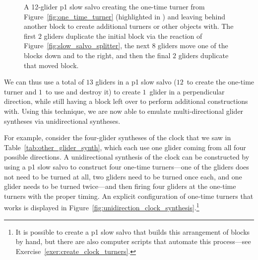 \begin{figure}[!htb]
{}  
	\caption{A 12-glider p1 slow salvo creating the one-time turner from Figure~\ref{fig:one_time_turner} (highlighted in ) and leaving behind another block to create additional turners or other objects with. The first $2$ gliders duplicate the initial block via the reaction of Figure~\ref{fig:slow_salvo_splitter}, the next $8$ gliders move one of the blocks down and to the right, and then the final $2$ gliders duplicate that moved block.}%
	\label{fig:create_one_time_turner}
\end{figure}

We can thus use a total of $13$ gliders in a p1 slow salvo ($12$~to create the one-time turner and $1$~to use and destroy it) to create $1$~glider in a perpendicular direction, while still having a block left over to perform additional constructions with. Using this technique, we are now able to emulate multi-directional glider syntheses via unidirectional syntheses.

For example, consider the four-glider syntheses of the clock that we saw in Table~\ref{tab:other_glider_synth}, which each use one glider coming from all four possible directions. A unidirectional synthesis of the clock can be constructed by using a p1 slow salvo to construct four one-time turners---one of the gliders does not need to be turned at all, two gliders need to be turned once each, and one glider needs to be turned twice---and then firing four gliders at the one-time turners with the proper timing. An explicit configuration of one-time turners that works is displayed in Figure~\ref{fig:unidirection_clock_synthesis}.\footnote{It is possible to create a p1 slow salvo that builds this arrangement of blocks by hand, but there are also computer scripts that automate this process---see Exercise~\ref{exer:create_clock_turners}.}

